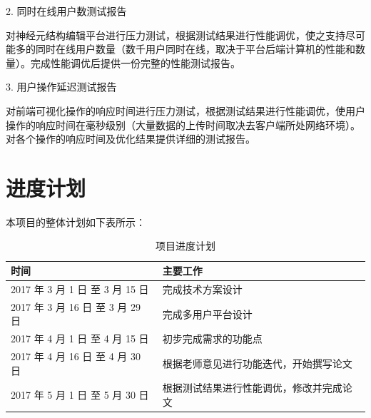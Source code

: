 2. 同时在线用户数测试报告

对神经元结构编辑平台进行压力测试，根据测试结果进行性能调优，使之支持尽可能多的同时在线用户数量（数千用户同时在线，取决于平台后端计算机的性能和数量）。完成性能调优后提供一份完整的性能测试报告。

3. 用户操作延迟测试报告

对前端可视化操作的响应时间进行压力测试，根据测试结果进行性能调优，使用户操作的响应时间在毫秒级别（大量数据的上传时间取决去客户端所处网络环境）。对各个操作的响应时间及优化结果提供详细的测试报告。


\section{进度计划}

本项目的整体计划如下表所示：

\begin{table}[!htbp]
\centering
\begin{tabular}{|l|l|}
\hline
时间 & 主要工作 \\ \hline
2017 年 3 月 1 日 至 3 月 15 日& 完成技术方案设计 \\ \hline
2017 年 3 月 16 日 至 3 月 29 日& 完成多用户平台设计 \\ \hline
2017 年 4 月 1 日 至 4 月 15 日& 初步完成需求的功能点 \\ \hline
2017 年 4 月 16 日 至 4 月 30 日& 根据老师意见进行功能迭代，开始撰写论文 \\ \hline
2017 年 5 月 1 日 至 5 月 30 日& 根据测试结果进行性能调优，修改并完成论文 \\ \hline

\end{tabular}
\caption{项目进度计划}
\label{table:schedule}
\end{table}


{
\renewcommand{\chapter}[2]{\section*{#2}\addcontentsline{toc}{section}{#2}}

}

